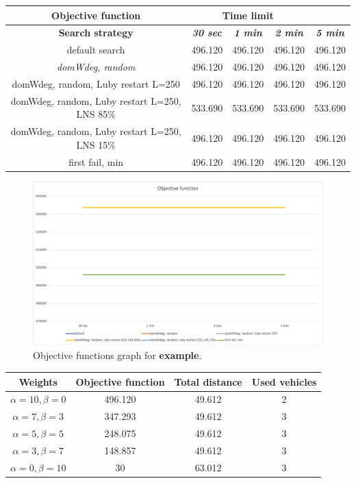 {
\renewcommand{\arraystretch}{2}
\begin{longtable}[h]{| c | c | c | c | c |}
    \hline
    \textbf{Objective function} & \multicolumn{3}{c}{\textbf{Time limit}} & \\
    \hline
    \textbf{Search strategy} & \textbf{\textit{30 sec}} & \textbf{\textit{1 min}} & \textbf{\textit{2 min}} & \textbf{\textit{5 min}} \\
    \hline
    \endhead
    default search                                & 496.120 & 496.120 & 496.120 & 496.120 \\
    \hline
    \textit{domWdeg, random}                      & 496.120 & 496.120 & 496.120 & 496.120 \\
    \hline
    domWdeg, random, Luby restart L=250           & 496.120 & 496.120 & 496.120 & 496.120 \\
    \hline
    domWdeg, random, Luby restart L=250, LNS 85\% & 533.690 & 533.690 & 533.690 & 533.690 \\
    \hline
    domWdeg, random, Luby restart L=250, LNS 15\% & 496.120 & 496.120 & 496.120 & 496.120 \\
    \hline
    first fail, min                               & 496.120 & 496.120 & 496.120 & 496.120 \\
    \hline
\end{longtable}
}

\begin{figure}[H]
    \centering
    \includegraphics[width=0.8\columnwidth]{../graphs/example-objf.png}
    \caption{Objective functions graph for \textbf{example}.}
\end{figure}

{
\renewcommand{\arraystretch}{2}
\begin{longtable}[h]{| c | c | c | c |}
    \hline
    \textbf{Weights} & \textbf{Objective function} & \textbf{Total distance} & \textbf{Used vehicles} \\
    \hline
    \endhead
    $\alpha = 10, \beta = 0$ & 496.120 & 49.612 & 2 \\
    \hline
    $\alpha = 7, \beta = 3$  & 347.293 & 49.612 & 3 \\
    \hline
    $\alpha = 5, \beta = 5$  & 248.075 & 49.612 & 3 \\
    \hline
    $\alpha = 3, \beta = 7$  & 148.857 & 49.612 & 3 \\
    \hline
    $\alpha = 0, \beta = 10$ &      30 & 63.012 & 3 \\
    \hline
\end{longtable}
}

